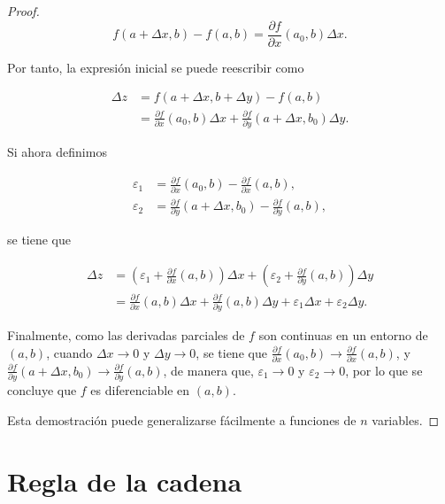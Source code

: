 \documentclass[
  a4paper,
]{scrreport}
\theoremstyle{definition}
\theoremstyle{plain}
\theoremstyle{plain}
\theoremstyle{definition}
\theoremstyle{definition}
\theoremstyle{plain}
\theoremstyle{remark}
\begin{document}
\begin{tcolorbox}
\begin{proof}
\[
f(a+\Delta x, b) - f(a,b) = \frac{\partial f}{\partial x}(a_0, b) \Delta x.
\]

Por tanto, la expresión inicial se puede reescribir como

\begin{align*}
\Delta z 
&= f(a+\Delta x, b+\Delta y) - f(a,b) \\
&= \frac{\partial f}{\partial x}(a_0, b) \Delta x + \frac{\partial f}{\partial y}(a+\Delta x, b_0) \Delta y.
\end{align*}

Si ahora definimos

\begin{align*}
\varepsilon_1 &= \frac{\partial f}{\partial x}(a_0,b)-\frac{\partial f}{\partial x}(a,b),\\
\varepsilon_2 &= \frac{\partial f}{\partial y}(a+\Delta x, b_0)-\frac{\partial f}{\partial y}(a,b),
\end{align*}

se tiene que

\begin{align*}
\Delta z 
&=
\left(\varepsilon_1 + \frac{\partial f}{\partial x}(a, b)\right)\Delta x + \left(\varepsilon_2 + \frac{\partial f}{\partial y}(a, b)\right)\Delta y \\
&= \frac{\partial f}{\partial x}(a, b)\Delta x + \frac{\partial f}{\partial y}(a, b)\Delta y + \varepsilon_1\Delta x + \varepsilon_2\Delta y.
\end{align*}

Finalmente, como las derivadas parciales de \(f\) son continuas en un
entorno de \((a,b)\), cuando \(\Delta x\to 0\) y \(\Delta y\to 0\), se
tiene que
\(\frac{\partial f}{\partial x}(a_0,b)\to \frac{\partial f}{\partial x}(a,b)\),
y
\(\frac{\partial f}{\partial y}(a+\Delta x, b_0)\to \frac{\partial f}{\partial y}(a,b)\),
de manera que, \(\varepsilon_1\to 0\) y \(\varepsilon_2\to 0\), por lo
que se concluye que \(f\) es diferenciable en \((a,b)\).

Esta demostración puede generalizarse fácilmente a funciones de \(n\)
variables.

\end{proof}

\end{tcolorbox}

\hypertarget{regla-de-la-cadena-2}{%
\section{Regla de la cadena}\label{regla-de-la-cadena-2}}
\end{document}
